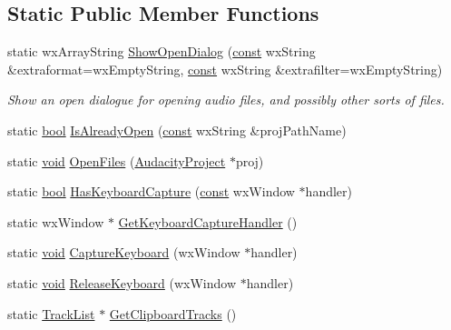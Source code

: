 \subsection*{Static Public Member Functions}
\begin{DoxyCompactItemize}
\item 
static wx\+Array\+String \hyperlink{class_audacity_project_a65235dc29daa87831b26fa78c41c9366}{Show\+Open\+Dialog} (\hyperlink{getopt1_8c_a2c212835823e3c54a8ab6d95c652660e}{const} wx\+String \&extraformat=wx\+Empty\+String, \hyperlink{getopt1_8c_a2c212835823e3c54a8ab6d95c652660e}{const} wx\+String \&extrafilter=wx\+Empty\+String)
\begin{DoxyCompactList}\small\item\em Show an open dialogue for opening audio files, and possibly other sorts of files. \end{DoxyCompactList}\item 
static \hyperlink{mac_2config_2i386_2lib-src_2libsoxr_2soxr-config_8h_abb452686968e48b67397da5f97445f5b}{bool} \hyperlink{class_audacity_project_a62798ced0fe2dcbd09aa219fd0258501}{Is\+Already\+Open} (\hyperlink{getopt1_8c_a2c212835823e3c54a8ab6d95c652660e}{const} wx\+String \&proj\+Path\+Name)
\item 
static \hyperlink{sound_8c_ae35f5844602719cf66324f4de2a658b3}{void} \hyperlink{class_audacity_project_a425f97194452a8e9753f3190386ba822}{Open\+Files} (\hyperlink{class_audacity_project}{Audacity\+Project} $\ast$proj)
\item 
static \hyperlink{mac_2config_2i386_2lib-src_2libsoxr_2soxr-config_8h_abb452686968e48b67397da5f97445f5b}{bool} \hyperlink{class_audacity_project_a52fa5fcf43219a6ad4f3a7fe284aee79}{Has\+Keyboard\+Capture} (\hyperlink{getopt1_8c_a2c212835823e3c54a8ab6d95c652660e}{const} wx\+Window $\ast$handler)
\item 
static wx\+Window $\ast$ \hyperlink{class_audacity_project_a917fe96ed9b1e2ceafb134de1212975f}{Get\+Keyboard\+Capture\+Handler} ()
\item 
static \hyperlink{sound_8c_ae35f5844602719cf66324f4de2a658b3}{void} \hyperlink{class_audacity_project_aa01e7e07556ae3ebb90b060dcd4395b1}{Capture\+Keyboard} (wx\+Window $\ast$handler)
\item 
static \hyperlink{sound_8c_ae35f5844602719cf66324f4de2a658b3}{void} \hyperlink{class_audacity_project_a6565795f4dde7aa65c854044d81d03ea}{Release\+Keyboard} (wx\+Window $\ast$handler)
\item 
static \hyperlink{class_track_list}{Track\+List} $\ast$ \hyperlink{class_audacity_project_a55baac007a4f9e15c8be9f6b0b515933}{Get\+Clipboard\+Tracks} ()

\end{DoxyCompactItemize}
